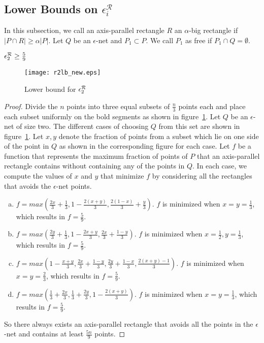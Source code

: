 \subsection{Lower Bounds on $\epsilon_i^{\mathcal{R}}$}
In this subsection, we call an axis-parallel rectangle $R$ an $\alpha$-big rectangle if $\vert P \cap R \vert \geq \alpha \vert P \vert$. Let $Q$ be an $\epsilon$-net and $P_1 \subset P$. We call $P_1$  as free if $P_1 \cap Q = \emptyset$.
\begin{lem}\label{lemma2RL}
 $\epsilon^{\cal{R}}_2 \geq \frac{5}{9}$
\end{lem}
\begin{figure}
\begin{center}
\texttt{[image: r2lb\_new.eps]}
\caption{Lower bound for $\epsilon^{\cal{R}}_2$}
\label{fig2RL}
\end{center}
\end{figure}
\begin{proof}
 Divide the $n$ points into three equal subsets of $\frac{n}{3}$
points each and place each subset uniformly
on the bold segments as shown in figure~\ref{fig2RL}. Let $Q$ be an
$\epsilon$-net of size two. The different cases of choosing
$Q$ from this set are shown in figure~\ref{fig2RL}. Let $x, y$ denote the fraction of
points from a subset which lie on one side of the point in $Q$ as shown in the
corresponding figure for each case. Let $f$ be a function that represents the
maximum fraction of points of $P$ 
that an axis-parallel rectangle contains without
containing any of the points in $Q$. In each case, we compute the values of 
$x$ and $ y $ that minimize $f$ by considering all the rectangles that avoids the $\epsilon$-net points.

\begin{enumerate}[(a)]
 \item $f=max(\frac{2x}{3}+\frac{1}{3}, 1-\frac{2(x+y)}{3},
\frac{2(1-x)}{3}+\frac{y}{3})$. $f$ is minimized when
$x=y=\frac{1}{3}$, which results in $f=\frac{5}{9}$.
 \item $f=max(\frac{2y}{3}+\frac{1}{3}, 1-\frac{2x+y}{3},
\frac{2x}{3}+\frac{1-y}{3})$. $f$ is minimized when
$x=\frac{1}{2}, y=\frac{1}{3}$, which results in $f=\frac{5}{9}$.
 \item $f=max(1-\frac{x+y}{3}, \frac{2x}{3}+\frac{1-y}{3},
\frac{2y}{3}+\frac{1-x}{3},\frac{2(x+y)-1}{3})$. $f$ is minimized when
$x=y=\frac{2}{3}$, which results in $f=\frac{5}{9}$.
 \item $f=max(\frac{1}{3}+\frac{2x}{3}, \frac{1}{3}+\frac{2y}{3},
1-\frac{2(x+y)}{3})$. $f$ is minimized when
$x=y=\frac{1}{3}$, which results in $f=\frac{5}{9}$.
\end{enumerate}
So there always exists an axis-parallel rectangle that avoids all the points in the $\epsilon$-net
and contains at least $\frac{5n}{9}$ points.

\end{proof}

